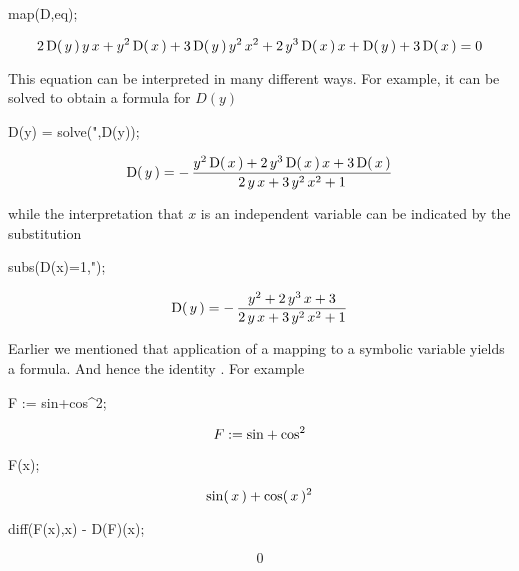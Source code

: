 \documentclass[11pt,dvips]{mtn}
\begin{document}
\begin{mapleinput}
map(D,eq);
\end{mapleinput}
\begin{maplettyout}
\end{maplettyout}
\begin{maplelatex}
\[
2\,{\rm D}(\,{y}\,)\,{y}\,{x} + {y}^{2}\,{\rm D}(\,{x}\,) + 3\,
{\rm D}(\,{y}\,)\,{y}^{2}\,{x}^{2} + 2\,{y}^{3}\,{\rm D}(\,{x}\,)
\,{x} + {\rm D}(\,{y}\,) + 3\,{\rm D}(\,{x}\,)=0
\]
\end{maplelatex}
This equation can be interpreted in many different ways.  For example,
it can be solved to obtain a formula for $D(y)$
\begin{mapleinput}
D(y) = solve(",D(y));
\end{mapleinput}
\begin{maplettyout}
\end{maplettyout}
\begin{maplelatex}
\[
{\rm D}(\,{y}\,)= - \,{\displaystyle \frac {{y}^{2}\,{\rm D}(\,{x
}\,) + 2\,{y}^{3}\,{\rm D}(\,{x}\,)\,{x} + 3\,{\rm D}(\,{x}\,)}{2
\,{y}\,{x} + 3\,{y}^{2}\,{x}^{2} + 1}}
\]
\end{maplelatex}
while the interpretation that $x$ is an independent variable can
be indicated by the substitution
\begin{mapleinput}
subs(D(x)=1,");
\end{mapleinput}
\begin{maplettyout}
\end{maplettyout}
\begin{maplelatex}
\[
{\rm D}(\,{y}\,)= - \,{\displaystyle \frac {{y}^{2} + 2\,{y}^{3}
\,{x} + 3}{2\,{y}\,{x} + 3\,{y}^{2}\,{x}^{2} + 1}}
\]
\end{maplelatex}

Earlier we mentioned that application of a mapping to a symbolic
variable yields a formula.  And hence the identity
.  For example

\begin{mapleinput}
F := sin+cos^2;
\end{mapleinput}
\begin{maplelatex}
\[
{F} := {\rm sin} + {\rm cos}^{2}
\]
\end{maplelatex}
\begin{mapleinput}
F(x);
\end{mapleinput}
\begin{maplelatex}
\[
{\rm sin}(\,{x}\,) + {\rm cos}(\,{x}\,)^{2}
\]
\end{maplelatex}
\begin{mapleinput}
diff(F(x),x) - D(F)(x);
\end{mapleinput}
\begin{maplelatex}
\[
0
\]
\end{maplelatex}
\end{document}
